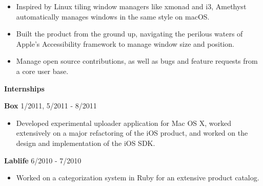 \documentclass{article}
\begin{document}
\vspace{1mm}

\begin{adjustwidth}{3mm}{5mm}
	\begin{itemize}
		\setlength\itemsep{-0.25mm}
		\item Inspired by Linux tiling window managers like xmonad and i3, Amethyst automatically manages windows in the same style on macOS.
		\item Built the product from the ground up, navigating the perilous waters of Apple’s Accessibility framework to manage window size and position.
		\item Manage open source contributions, as well as bugs and feature requests from a core user base.
	\end{itemize}
\end{adjustwidth}

\vspace{3mm}

{\large\bf Internships}\\

\vspace{-2mm}

{
	\hspace{2mm}
	{\bf Box}
	\hfill
	1/2011, 5/2011 - 8/2011
}

\begin{adjustwidth}{4mm}{5mm}
	\begin{itemize}
		\setlength\itemsep{-0.25mm}
		\item Developed experimental uploader application for Mac OS X, worked extensively on a major refactoring of the iOS product, and worked on the design and implementation of the iOS SDK.
	\end{itemize}
\end{adjustwidth}

\vspace{2mm}

{
	\hspace{2mm}
	{\bf Lablife}
	\hfill
	6/2010 - 7/2010
}

\begin{adjustwidth}{4mm}{5mm}
	\begin{itemize}
		\setlength\itemsep{-0.25mm}
		\item Worked on a categorization system in Ruby for an extensive product catalog.
	\end{itemize}
\end{adjustwidth}

\vspace{2mm}
\end{document}
